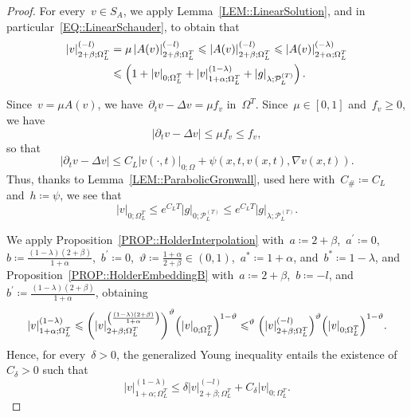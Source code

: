 \documentclass[12pt,a4paper]{amsart}
\makeatletter
\numberwithin{equation}{section}
\theoremstyle{definition}
\theoremstyle{remark}
\newcommand{\abs}[1]{\left\lvert#1\right\rvert}
\renewcommand{\leq}{\leqslant}
\renewcommand{\geq}{\geqslant}
\newcommand{\const}[1]{%
  \csname const@#1\endcsname%
}
\newcommand{\constapp}[1]{%
  \csname constapp@#1\endcsname%
}
\makeatother
\begin{document}
\begin{proof}
    For every~$v \in S_A$, we apply Lemma~\ref{LEM::LinearSolution}, and in particular~\eqref{EQ::LinearSchauder}, to obtain that
    \begin{equation}\label{EQ::SchaeferBound}
        \begin{split}
            \abs{v}_{2+\beta; \Omega_L^T}^{(-l)} &= \mu\abs{A(v)}_{2+\beta;\Omega_L^T}^{(-l)} \leq \abs{A(v)}_{2+\beta; \Omega_L^T}^{(-l)} \leq \abs{A(v)}_{2+\alpha; \Omega_L^T}^{(-\lambda)}\\
                &\leq \const{CONST::LinearSchauder}\left(1+\abs{v}_{0; \Omega_L^T} +\abs{v}_{1+\alpha; \Omega_L^T}^{(1-\lambda)} + \abs{g}_{\lambda; \mathcal{P}_L^{(T)}}\right).
        \end{split}
    \end{equation}

    Since~$v = \mu A(v)$, we have~$\partial_t v -\Delta v = \mu f_v$ in~$\Omega^T$. Since~$\mu \in [0,1]$ and~$f_v \geq 0$, we have
    \begin{equation}
        \abs{\partial_t v -\Delta v} \leq \mu f_v \leq f_v,
    \end{equation}
    so that
    \begin{equation}
        \abs{\partial_t v - \Delta v} \leq C_L \abs{v(\cdot,t)}_{0; \Omega} + \psi(x,t,v(x,t),\nabla v(x,t)).
    \end{equation}
    Thus, thanks to Lemma~\ref{LEM::ParabolicGronwall}, used here with~$C_\# \coloneq C_L$ and~$h \coloneq \psi$, we see that 
    \begin{equation}\label{EQ::SchaeferSupNorm}
        \abs{v}_{0; \Omega_L^T} \leq e^{C_L T} \abs{g}_{0; \mathcal{P}_L^{(T)}}\leq e^{C_L T} \abs{g}_{\lambda; \mathcal{P}_L^{(T)}}.
    \end{equation}

    We apply Proposition~\ref{PROP::HolderInterpolation} with~$a \coloneq 2+\beta$,~$a^\prime \coloneq 0$,~$b \coloneq \frac{(1-\lambda)(2+\beta)}{1+\alpha}$,~$b^\prime \coloneq 0$,~$\vartheta \coloneq \frac{1+\alpha}{2+\beta} \in (0,1)$,~$a^\ast \coloneq 1+\alpha$, and~$b^\ast \coloneq 1-\lambda$, and Proposition~\ref{PROP::HolderEmbeddingB} with~$a \coloneq 2+\beta$,~$b \coloneq -l$, and~$b^\prime \coloneq \frac{(1-\lambda)(2+\beta)}{1+\alpha}$, obtaining
    \begin{equation}
        \abs{v}_{1+\alpha; \Omega_L^T}^{(1-\lambda)} \leq \constapp{CONST::HolderInterpolation} {\left(\abs{v}_{2+\beta; \Omega_L^T}^{\left(\frac{(1-\lambda)(2+\beta)}{1+\alpha}\right)}\right)}^\vartheta{\left(\abs{v}_{0; \Omega_L^T}\right)}^{1-\vartheta}\leq \constapp{CONST::HolderInterpolation}\constapp{CONST::HolderEmbeddingB}^\vartheta{\left(\abs{v}_{2+\beta; \Omega_L^T}^{(-l)}\right)}^\vartheta{\left(\abs{v}_{0; \Omega_L^T}\right)}^{1-\vartheta}.
    \end{equation}
    Hence, for every~$\delta > 0$, the generalized Young inequality entails the existence of~$C_\delta > 0$ such that
    \begin{equation}\label{EQ::vEstimateYoung}
        \abs{v}_{1+\alpha; \Omega_L^T}^{(1-\lambda)} \leq \delta \abs{v}_{2+\beta; \Omega_L^T}^{(-l)} + C_\delta \abs{v}_{0; \Omega_L^T}.
    \end{equation}


\end{proof}
\end{document}

